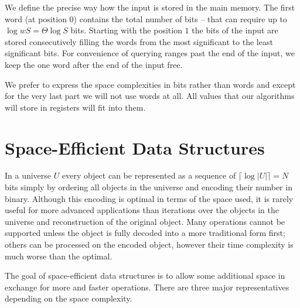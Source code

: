 We define the precise way how the input is stored in the main memory.
The first word (at position $0$) contains the total number of bits -- that can require up to $\log w S = \Theta \log S$ bits.
Starting with the position $1$ the bits of the input are stored consecutively filling the words from the most significant to the least significant bits.
For convenience of querying ranges past the end of the input, we keep the one word after the end of the input free.

We prefer to express the space complexities in bits rather than words and except for the very last part we will not use words at all.
All values that our algorithms will store in registers will fit into them.

\section{Space-Efficient Data Structures}

In a universe $U$ every object can be represented as a sequence of $\lceil \log |U| \rceil = N$ bits simply by ordering all objects in the universe and encoding their number in binary.
Although this encoding is optimal in terms of the space used, it is rarely useful for more advanced applications than iterations over the objects in the universe and reconstruction of the original object.
Many operations cannot be supported unless the object is fully decoded into a more traditional form first; others can be processed on the encoded object, however their time complexity is much worse than the optimal.

The goal of space-efficient data structures is to allow some additional space in exchange for more and faster operations.
There are three major representatives depending on the space complexity.

